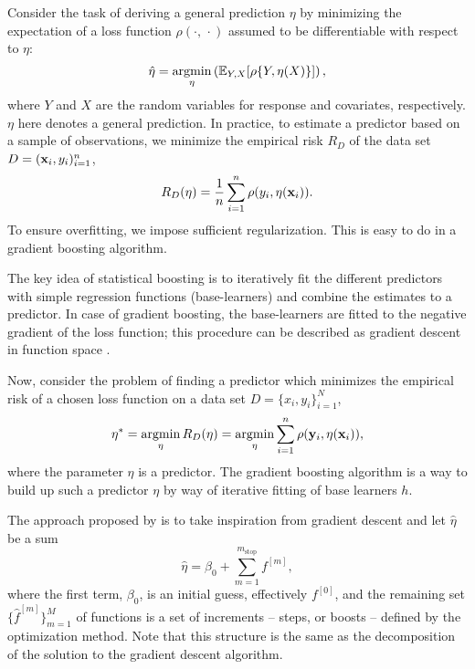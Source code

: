 Consider the task of deriving a general prediction $\eta$ by minimizing the expectation of a loss function $\rho(\cdot,\,\cdot)$
assumed to be differentiable with respect to $\eta$:
\begin{equation}
    \hat{\eta}=\operatorname*{argmin}_\eta\left(\mathbb{E}_{Y,X}[\rho\{Y,\eta(X)\}]\right),
\end{equation}
where $Y$ and $X$ are the random variables for response and covariates, respectively. $\eta$ here denotes a general prediction.
In practice, to estimate a predictor based on a sample of observations, we minimize the empirical risk $R_D$ of the data set
$D=(\mathbf{x}_i,y_i)_{i=1}^n$,
\begin{equation}
    R_D(\eta)=\frac{1}{n}\sum_{i=1}^n \rho(y_i,\eta(\mathbf{x}_i)).
\end{equation}
To ensure overfitting, we impose sufficient regularization. This is easy to do in a gradient boosting algorithm.

The key idea of statistical boosting is to iteratively fit the different predictors with simple regression functions (base-learners) and combine the estimates to a predictor. In case of gradient boosting, the base-learners are fitted to the negative gradient of the loss function; this procedure can be described as gradient descent in function space \citep{buhlmann2007}.

Now, consider the problem of finding a predictor which minimizes the empirical risk of a chosen loss function on a data set
$D=\{x_i,y_i\}_{i=1}^N$,
\begin{equation}\label{eq:argmin-eta}
    \eta^*=\operatorname*{argmin}_{\eta}R_D(\eta)=\operatorname*{argmin}_{\eta}\sum_{i=1}^n\rho(\mathbf{y}_i,\eta(\mathbf{x}_i)),
\end{equation}
where the parameter $\eta$ is a predictor.
The gradient boosting algorithm is a way to build up such a predictor $\eta$ by way of iterative fitting of base learners $h$.

The approach proposed by \citet{friedman2001} is to take inspiration from gradient descent and let $\hat{\eta}$ be a sum
\begin{equation}
    \hat{\eta}=\beta_0+\sum_{m=1}^{m_{\text{stop}}}f^{[m]},
\end{equation}
where the first term, $\beta_0$, is an initial guess, effectively $f^{[0]}$, and the remaining set $\{\hat{f}^{[m]}\}_{m=1}^M$ of 
functions is a set of increments -- steps, or boosts -- defined by the optimization method. Note that this structure
is the same as the decomposition of the solution to the gradient descent algorithm.


